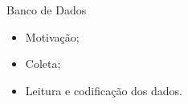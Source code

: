 \documentclass{beamer}
\begin{document}
\begin{frame}{Banco de Dados}
\begin{itemize}
    \item Motivação;
    \vspace{24pt}
        
    \item Coleta;
    \vspace{24pt}
        
    \item Leitura e codificação dos dados.
\end{itemize}
\end{frame}
\end{document}
